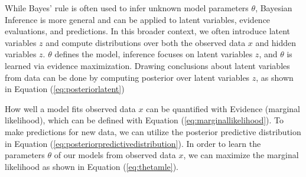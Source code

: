 \documentclass[ %
                    author={Revalda Putawara},
                supervisor={Dr. James Pope},
                    degree={MSc},
                     title={Robustness of Bayesian Neural Networks Design Choices Against Weight and Bias Perturbation Induced by Single Event Upsets (SEUs)},
                      type={},
                      year={2025}]{dissertation}
\begin{document}




While Bayes' rule is often used to infer unknown model parameters $\theta$, Bayesian Inference is more general and can be applied to latent variables, evidence evaluations, and predictions. In this broader context, we often introduce latent variables $z$ and compute distributions over both the observed data $x$ and hidden variables $z$. $\theta$ defines the model, inference focuses on latent variables $z$, and $\theta$ is learned via evidence maximization. Drawing conclusions about latent variables from data can be done by computing posterior over latent variables $z$, as shown in Equation (\ref{eq:posteriorlatent})


How well a model fits observed data $x$ can be quantified with Evidence (marginal likelihood), which can be defined with Equation (\ref{eq:marginallikelihood}). To make predictions for new data, we can utilize the posterior predictive distribution in Equation (\ref{eq:posteriorpredictivedistribution}). In order to learn the parameters $\theta$ of our models from observed data $x$, we can maximize the marginal likelihood as shown in Equation (\ref{eq:thetamle}).



\end{document}
